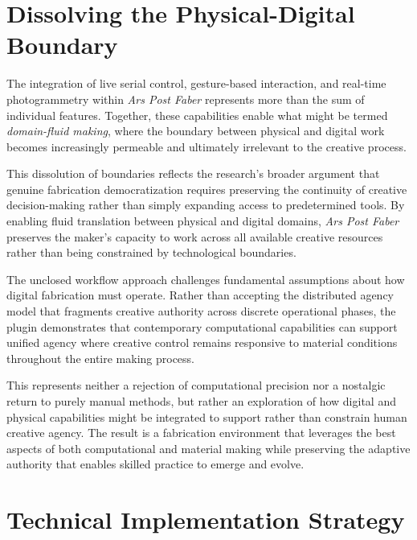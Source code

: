 \section{Dissolving the Physical-Digital Boundary}

The integration of live serial control, gesture-based interaction, and real-time photogrammetry within \textit{Ars Post Faber} represents more than the sum of individual features. Together, these capabilities enable what might be termed \textit{domain-fluid making}, where the boundary between physical and digital work becomes increasingly permeable and ultimately irrelevant to the creative process.

\vspace{0.5cm}

This dissolution of boundaries reflects the research's broader argument that genuine fabrication democratization requires preserving the continuity of creative decision-making rather than simply expanding access to predetermined tools. By enabling fluid translation between physical and digital domains, \textit{Ars Post Faber} preserves the maker's capacity to work across all available creative resources rather than being constrained by technological boundaries.

\vspace{0.5cm}

The unclosed workflow approach challenges fundamental assumptions about how digital fabrication must operate. Rather than accepting the distributed agency model that fragments creative authority across discrete operational phases, the plugin demonstrates that contemporary computational capabilities can support unified agency where creative control remains responsive to material conditions throughout the entire making process.

\vspace{0.5cm}

This represents neither a rejection of computational precision nor a nostalgic return to purely manual methods, but rather an exploration of how digital and physical capabilities might be integrated to support rather than constrain human creative agency. The result is a fabrication environment that leverages the best aspects of both computational and material making while preserving the adaptive authority that enables skilled practice to emerge and evolve.

\section{Technical Implementation Strategy}

